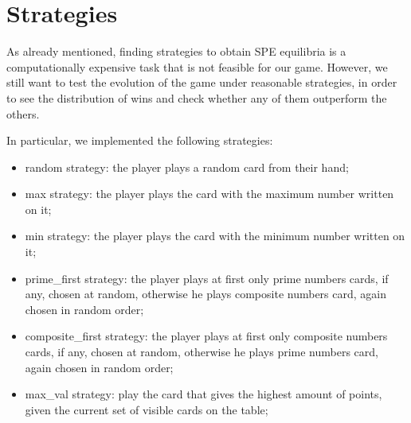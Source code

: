 \section{Strategies} \label{section: Strategies}%
As already mentioned, finding strategies to obtain SPE equilibria is a computationally expensive task that is not feasible for our game.
However, we still want to test the evolution of the game under reasonable strategies, in order to see the distribution of wins and check whether any of them outperform the others.

In particular, we implemented the following strategies:
\begin{itemize}
    \item random strategy: the player plays a random card from their hand;
    \item max strategy: the player plays the card with the maximum number written on it;
    \item min strategy: the player plays the card with the minimum number written on it;
    \item prime\_first strategy: the player plays at first only prime numbers cards, if any, chosen at random, otherwise he plays composite numbers card, again chosen in random order;
    \item composite\_first strategy: the player plays at first only composite numbers cards, if any, chosen at random, otherwise he plays prime numbers card, again chosen in random order;
    \item max\_val strategy: play the card that gives the highest amount of points, given the current set of visible cards on the table;
\end{itemize}

